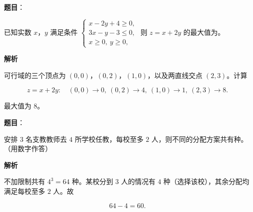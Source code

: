 \begin{answer}

\textbf{题目}：

已知实数 $x$，$y$ 满足条件 $\begin{cases}x-2y+4\geqslant0,\\ 3x-y-3\leqslant0,\\ x\geqslant0,\ y\geqslant0,\end{cases}$ 则 $z=x+2y$ 的最大值为\gkblank{}。

\textbf{解析}

可行域的三个顶点为 $(0,0)$，$(0,2)$，$(1,0)$，以及两直线交点 $(2,3)$。计算

\nopagebreak[4]
\[z=x+2y:\quad (0,0)\to0,\ (0,2)\to4,\ (1,0)\to1,\ (2,3)\to8.\]

最大值为 $8$。


\end{answer}
\begin{answer}

\textbf{题目}：

安排 $3$ 名支教教师去 $4$ 所学校任教，每校至多 $2$ 人，则不同的分配方案共有\gkblank{}种。（用数字作答）

\textbf{解析}

不加限制共有 $4^3=64$ 种。某校分到 $3$ 人的情况有 $4$ 种（选择该校），其余分配均满足每校至多 $2$ 人。故

\nopagebreak[4]
\[64-4=60.\]


\end{answer}
